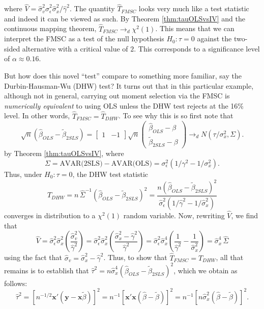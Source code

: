 \documentclass[12pt]{article}
\theoremstyle{definition}
\begin{document}
where $\widehat{V} = \widehat{\sigma}_v^2 \widehat{\sigma}_\epsilon^2 \widehat{\sigma}_x^2/\widehat{\gamma}^2$. 
The quantity $\widehat{T}_{FMSC}$ looks very much like a test statistic and indeed it can be viewed as such. 
By Theorem \ref{thm:tauOLSvsIV} and the continuous mapping theorem, $\widehat{T}_{FMSC} \rightarrow_d \chi^2(1)$. 
This means that we can interpret the FMSC as a test of the null hypothesis $H_0\colon \tau = 0$ against the two-sided alternative with a critical value of $2$. 
This corresponds to a significance level of $\alpha \approx 0.16$. 

But how does this novel ``test'' compare to something more familiar, say the Durbin-Hausman-Wu (DHW) test? 
It turns out that in this particular example, although not in general, carrying out moment selection via the FMSC is \emph{numerically equivalent} to using OLS unless the DHW test rejects at the 16\% level. 
In other words, $\widehat{T}_{FMSC} = \widehat{T}_{DHW}$. 
To see why this is so first note that 
$$ \sqrt{n}\left(\widehat{\beta}_{OLS} - \widetilde{\beta}_{2SLS}\right) =\left[\begin{array}{cc}
    1 & -1
    \end{array}\right] \sqrt{n} \left(\begin{array}{c}
    \widehat{\beta}_{OLS} - \beta  \\ \widetilde{\beta}_{2SLS} - \beta
    \end{array} \right) \rightarrow_d N\left(\tau/\sigma_x^2, \Sigma
    \right).$$
by Theorem \ref{thm:tauOLSvsIV}, where
	$$\Sigma = \mbox{AVAR(2SLS)} - \mbox{AVAR(OLS)} = \sigma_\epsilon^2 \left(1/\gamma^2 - 1/\sigma_x^2 \right).$$
Thus, under $H_0 \colon \tau = 0$, the DHW test statistic 
$$\widehat{T}_{DHW} = n\, \widehat{\Sigma}^{-1}(\widehat{\beta}_{OLS} - \widetilde{\beta}_{2SLS})^2 = \frac{n(\widehat{\beta}_{OLS} - \widetilde{\beta}_{2SLS})^2}{ \widehat{\sigma}_\epsilon^2 \left(1/\widehat{\gamma}^2 - 1/\widehat{\sigma}_x^2 \right)}$$
converges in distribution to a $\chi^2(1)$ random variable. 
Now, rewriting $\widehat{V}$, we find that
$$\widehat{V} = \widehat{\sigma}_\epsilon^2 \widehat{\sigma}_x^2\left(\frac{\widehat{\sigma}_v^2 }{\widehat{\gamma}^2}\right) = \widehat{\sigma}_\epsilon^2 \widehat{\sigma}_x^2\left(\frac{\widehat{\sigma}_x^2 - \widehat{\gamma}^2 }{\widehat{\gamma}^2}\right) = \widehat{\sigma}_\epsilon^2 \widehat{\sigma}_x^4\left(\frac{1}{\widehat{\gamma}^2} - \frac{1}{\widehat{\sigma}_x^2}\right) = \widehat{\sigma}_x^4 \,\widehat{\Sigma}$$
using the fact that $\widehat{\sigma}_v = \widehat{\sigma}_x^2 - \widehat{\gamma}^2$. 
Thus, to show that $\widehat{T}_{FMSC} = \widehat{T}_{DHW}$, all that remains is to establish that $\widehat{\tau}^2 = n\widehat{\sigma}_x^4 (\widehat{\beta}_{OLS} - \widetilde{\beta}_{2SLS})^2$, which we obtain as follows:
    $$\widehat{\tau}^2  =  \left[n^{-1/2} \textbf{x}'(\mathbf{y} - \mathbf{x}\widetilde{\beta})\right]^2 = n^{-1}\left[\mathbf{x}'\mathbf{x} \left( \widehat{\beta} - \widetilde{\beta}\right) \right]^2 = n^{-1}\left[n \widehat{\sigma}_x^2 \left( \widehat{\beta} - \widetilde{\beta}\right) \right]^2.$$
\end{document}
